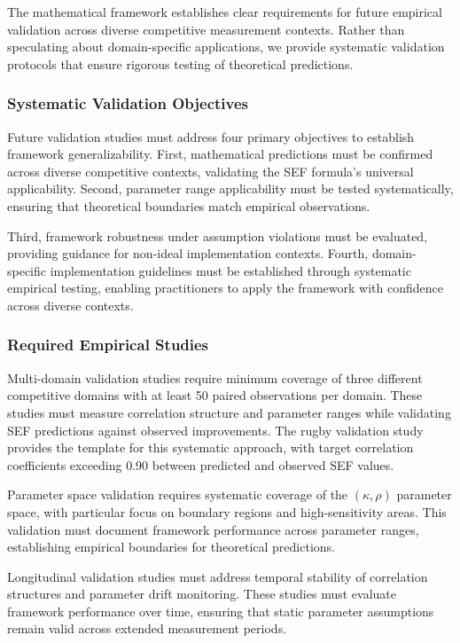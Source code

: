 The mathematical framework establishes clear requirements for future empirical validation across diverse competitive measurement contexts. Rather than speculating about domain-specific applications, we provide systematic validation protocols that ensure rigorous testing of theoretical predictions.

\subsubsection{Systematic Validation Objectives}

Future validation studies must address four primary objectives to establish framework generalizability. First, mathematical predictions must be confirmed across diverse competitive contexts, validating the SEF formula's universal applicability. Second, parameter range applicability must be tested systematically, ensuring that theoretical boundaries match empirical observations.

Third, framework robustness under assumption violations must be evaluated, providing guidance for non-ideal implementation contexts. Fourth, domain-specific implementation guidelines must be established through systematic empirical testing, enabling practitioners to apply the framework with confidence across diverse contexts.

\subsubsection{Required Empirical Studies}

Multi-domain validation studies require minimum coverage of three different competitive domains with at least 50 paired observations per domain. These studies must measure correlation structure and parameter ranges while validating SEF predictions against observed improvements. The rugby validation study provides the template for this systematic approach, with target correlation coefficients exceeding 0.90 between predicted and observed SEF values.

Parameter space validation requires systematic coverage of the $(\kappa, \rho)$ parameter space, with particular focus on boundary regions and high-sensitivity areas. This validation must document framework performance across parameter ranges, establishing empirical boundaries for theoretical predictions.

Longitudinal validation studies must address temporal stability of correlation structures and parameter drift monitoring. These studies must evaluate framework performance over time, ensuring that static parameter assumptions remain valid across extended measurement periods.

